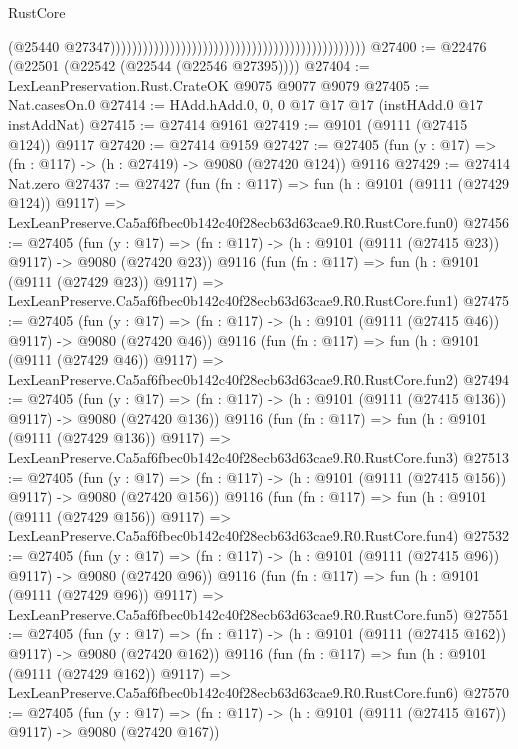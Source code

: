 \begin{lexlean}{RustCore}
\begin{coremodule}
                                                                                                (@25440
                                                                                                  @27347)))))))))))))))))))))))))))))))))))))))))))))))
@27400 := @22476 (@22501 (@22542 (@22544 (@22546 @27395))))
@27404 := LexLeanPreservation.Rust.CrateOK @9075 @9077 @9079
@27405 := Nat.casesOn.{0}
@27414 := HAdd.hAdd.{0, 0, 0} @17 @17 @17 (instHAdd.{0} @17 instAddNat)
@27415 := @27414 @9161
@27419 := @9101 (@9111 (@27415 @124)) @9117
@27420 := @27414 @9159
@27427 := @27405 (fun (y : @17) => (fn : @117) -> (h : @27419) -> @9080 (@27420 @124)) @9116
@27429 := @27414 Nat.zero
@27437 := @27427
    (fun (fn : @117) =>
    fun (h : @9101 (@9111 (@27429 @124)) @9117) =>
    LexLeanPreserve.Ca5af6fbec0b142c40f28ecb63d63cae9.R0.RustCore.fun0)
@27456 := @27405
    (fun (y : @17) => (fn : @117) -> (h : @9101 (@9111 (@27415 @23)) @9117) -> @9080 (@27420 @23))
    @9116
    (fun (fn : @117) =>
    fun (h : @9101 (@9111 (@27429 @23)) @9117) =>
    LexLeanPreserve.Ca5af6fbec0b142c40f28ecb63d63cae9.R0.RustCore.fun1)
@27475 := @27405
    (fun (y : @17) => (fn : @117) -> (h : @9101 (@9111 (@27415 @46)) @9117) -> @9080 (@27420 @46))
    @9116
    (fun (fn : @117) =>
    fun (h : @9101 (@9111 (@27429 @46)) @9117) =>
    LexLeanPreserve.Ca5af6fbec0b142c40f28ecb63d63cae9.R0.RustCore.fun2)
@27494 := @27405
    (fun (y : @17) => (fn : @117) -> (h : @9101 (@9111 (@27415 @136)) @9117) -> @9080 (@27420 @136))
    @9116
    (fun (fn : @117) =>
    fun (h : @9101 (@9111 (@27429 @136)) @9117) =>
    LexLeanPreserve.Ca5af6fbec0b142c40f28ecb63d63cae9.R0.RustCore.fun3)
@27513 := @27405
    (fun (y : @17) => (fn : @117) -> (h : @9101 (@9111 (@27415 @156)) @9117) -> @9080 (@27420 @156))
    @9116
    (fun (fn : @117) =>
    fun (h : @9101 (@9111 (@27429 @156)) @9117) =>
    LexLeanPreserve.Ca5af6fbec0b142c40f28ecb63d63cae9.R0.RustCore.fun4)
@27532 := @27405
    (fun (y : @17) => (fn : @117) -> (h : @9101 (@9111 (@27415 @96)) @9117) -> @9080 (@27420 @96))
    @9116
    (fun (fn : @117) =>
    fun (h : @9101 (@9111 (@27429 @96)) @9117) =>
    LexLeanPreserve.Ca5af6fbec0b142c40f28ecb63d63cae9.R0.RustCore.fun5)
@27551 := @27405
    (fun (y : @17) => (fn : @117) -> (h : @9101 (@9111 (@27415 @162)) @9117) -> @9080 (@27420 @162))
    @9116
    (fun (fn : @117) =>
    fun (h : @9101 (@9111 (@27429 @162)) @9117) =>
    LexLeanPreserve.Ca5af6fbec0b142c40f28ecb63d63cae9.R0.RustCore.fun6)
@27570 := @27405
    (fun (y : @17) => (fn : @117) -> (h : @9101 (@9111 (@27415 @167)) @9117) -> @9080 (@27420 @167))

\end{coremodule}
\end{lexlean}
